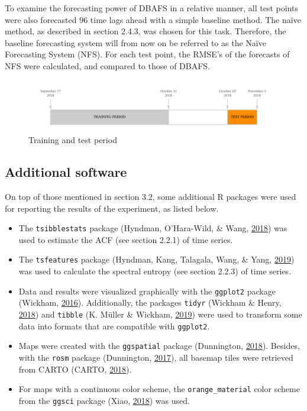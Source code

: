 \documentclass[12pt,oneside]{reedthesis}
\providecommand{\tightlist}{%
  \setlength{\itemsep}{0pt}\setlength{\parskip}{0pt}}
\begin{document}
To examine the forecasting power of DBAFS in a relative manner, all test
points were also forecasted 96 time lags ahead with a simple baseline
method. The naïve method, as described in section 2.4.3, was chosen for
this task. Therefore, the baseline forecasting system will from now on
be referred to as the Naïve Forecasting System (NFS). For each test
point, the RMSE's of the forecasts of NFS were calculated, and compared
to those of DBAFS.
\begin{figure}[h]
\includegraphics[width=\textwidth]{Figures/traintest} \caption{Training and test period}\label{fig:traintest}
\end{figure}
\subsection{Additional software}\label{additional-software}

On top of those mentioned in section 3.2, some additional R packages
were used for reporting the results of the experiment, as listed below.
\begin{itemize}
\tightlist
\item
  The \texttt{tsibblestats} package (Hyndman, O'Hara-Wild, \& Wang,
  \protect\hyperlink{ref-tsibblestats}{2018}) was used to estimate the
  ACF (see section 2.2.1) of time series.
\item
  The \texttt{tsfeatures} package (Hyndman, Kang, Talagala, Wang, \&
  Yang, \protect\hyperlink{ref-tsfeatures}{2019}) was used to calculate
  the spectral entropy (see section 2.2.3) of time series.
\item
  Data and results were visualized graphically with the \texttt{ggplot2}
  package (Wickham, \protect\hyperlink{ref-ggplot}{2016}). Additionally,
  the packages \texttt{tidyr} (Wickham \& Henry,
  \protect\hyperlink{ref-tidyr}{2018}) and \texttt{tibble} (K. Müller \&
  Wickham, \protect\hyperlink{ref-tibble}{2019}) were used to transform
  some data into formats that are compatible with \texttt{ggplot2}.
\item
  Maps were created with the \texttt{ggspatial} package (Dunnington,
  \protect\hyperlink{ref-ggspatial}{2018}). Besides, with the
  \texttt{rosm} package (Dunnington,
  \protect\hyperlink{ref-rosm}{2017}), all basemap tiles were retrieved
  from CARTO (CARTO, \protect\hyperlink{ref-carto}{2018}).
\item
  For maps with a continuous color scheme, the \texttt{orange\_material}
  color scheme from the \texttt{ggsci} package (Xiao,
  \protect\hyperlink{ref-ggsci}{2018}) was used.
\end{itemize}
\end{document}
